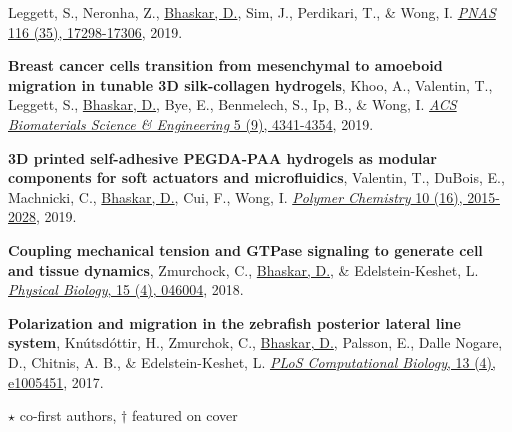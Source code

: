 \documentclass[margin,line]{res}
\begin{document}
\begin{resume}
{\begin{etaremune}[start=16]
Leggett, S., Neronha, Z., \underline{Bhaskar, D.}, Sim, J., Perdikari, T., \& Wong, I. 
\href{https://www.pnas.org/content/116/35/17298.short}{\textit{PNAS} 116 (35), 17298-17306}, 2019.
\item{\bf Breast cancer cells transition from mesenchymal to amoeboid migration in tunable 3D silk-collagen hydrogels},
Khoo, A., Valentin, T., Leggett, S., \underline{Bhaskar, D.}, Bye, E., Benmelech, S., Ip, B., \& Wong, I. 
\href{https://pubs.acs.org/doi/abs/10.1021/acsbiomaterials.9b00519}{\textit{ACS Biomaterials Science \& Engineering} 5 (9), 4341-4354}, 2019.
\vspace*{.1cm}
\item{\bf 3D printed self-adhesive PEGDA-PAA hydrogels as modular components for soft actuators and microfluidics}, 
Valentin, T., DuBois, E., Machnicki, C., \underline{Bhaskar, D.}, Cui, F., Wong, I. 
\href{https://pubs.rsc.org/ko/content/articlehtml/2019/py/c9py00211a}{\textit{Polymer Chemistry} 10 (16), 2015-2028}, 2019.
\vspace*{.1cm}
\item{\bf Coupling mechanical tension and GTPase signaling to generate cell and tissue dynamics}, 
Zmurchock, C., \underline{Bhaskar, D.}, \& Edelstein-Keshet, L. 
\href{https://iopscience.iop.org/article/10.1088/1478-3975/aab1c0/meta}{\textit{Physical Biology}, 15 (4), 046004}, 2018.
\vspace*{.1cm}
\item{\bf Polarization and migration in the zebrafish posterior lateral line system}, 
Kn\'{u}tsd\'{o}ttir, H., Zmurchok, C., \underline{Bhaskar, D.}, Palsson, E., Dalle Nogare, D., Chitnis, A. B., \& Edelstein-Keshet, L. 
\href{https://journals.plos.org/ploscompbiol/article?id=10.1371/journal.pcbi.1005451&rev=2}{\textit{PLoS Computational Biology}, 13 (4), e1005451}, 2017.
\item[] $\star$ co-first authors, $\dagger$ featured on cover
\end{etaremune}
}

\vspace*{.15cm}



\end{resume}
\end{document}
